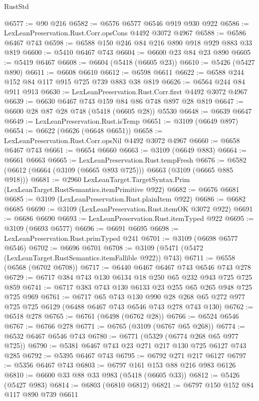 \begin{lexlean}{RustStd}
\begin{coremodule}
@6577 := @90 @216
@6582 := @6576 @6577 @6546 @919 @930 @922
@6586 := LexLeanPreservation.Rust.Corr.opsCons @4492 @3072 @4967
@6588 := @6586 @6467 @743
@6598 := @6588 @150 @246 @84 @216 @890 @918 @929 @883 @33 @819
@6600 := @5410 @6467 @743
@6604 := @6600 @23 @84 @23 @890
@6605 := @5419 @6467
@6608 := @6604 (@5418 (@6605 @23))
@6610 := @5426 (@5427 @890)
@6611 := @6608 @6610
@6612 := @6598 @6611
@6622 := @6588 @244 @152 @84 @117 @915 @725 @739 @883 @38 @819
@6626 := @6564 @244 @84 @911 @913
@6630 := LexLeanPreservation.Rust.Corr.first @4492 @3072 @4967
@6639 := @6630 @6467 @743 @159 @84 @86 @748 @897 @28 @819
@6647 := @6600 @28 @87 @28 @748 (@5418 (@6605 @28)) @5530
@6648 := @6639 @6647
@6649 := LexLeanPreservation.Rust.isTemp
@6651 := @3109 (@6649 @897)
@6654 := @6622 (@6626 (@6648 @6651))
@6658 := LexLeanPreservation.Rust.Corr.opsNil @4492 @3072 @4967
@6660 := @6658 @6467 @743
@6661 := @6654 @6660
@6663 := @3109 (@6649 @883)
@6664 := @6661 @6663
@6665 := LexLeanPreservation.Rust.tempFresh
@6676 := @6582 (@6612 (@6664 (@3109 (@6665 @893 @725))) @6663 (@3109 (@6665 @885 @918)))
@6681 := @2960 LexLeanTarget.TargetSyntax.Prim (LexLeanTarget.RustSemantics.itemPrimitive @922)
@6682 := @6676 @6681
@6685 := @3109 (LexLeanPreservation.Rust.plainItem @922)
@6686 := @6682 @6685
@6690 := @3109 (LexLeanPreservation.Rust.itemOK @3072 @922)
@6691 := @6686 @6690
@6693 := LexLeanPreservation.Rust.itemTyped @922
@6695 := @3109 (@6693 @6577)
@6696 := @6691 @6695
@6698 := LexLeanPreservation.Rust.primTyped @241
@6701 := @3109 (@6698 @6577 @6546)
@6702 := @6696 @6701
@6708 := @3109 (@5471 (@5472 (LexLeanTarget.RustSemantics.itemFallible @922)) @743)
@6711 := @6558 (@6568 (@6702 @6708))
@6717 := @6440 @6467 @6467 @743 @6546 @743 @278
@6729 := @6717 @384 @743 @130 @6134 @18 @250 @65 @232 @943 @725 @725 @859
@6741 := @6717 @383 @743 @130 @6133 @23 @255 @65 @265 @948 @725 @725 @969
@6761 := @6717
    @65
    @743
    @130
    @990
    @28
    @268
    @65
    @272
    @977
    @725
    @725
    @6129
    (@6488 @6467 @743 @6546 @743 @278 @743 @130)
@6762 := @6518 @278
@6765 := @6761 (@6498 (@6762 @28))
@6766 := @6524 @6546
@6767 := @6766 @278
@6771 := @6765 (@3109 (@6767 @65 @268))
@6774 := @6532 @6467 @6546 @743
@6780 := @6771 (@5329 (@6774 @268 @65 @977 @725))
@6790 := @5381 @6467 @743 @23 @271 @217 @130 @725 @6127 @743 @285
@6792 := @5395 @6467 @743
@6795 := @6792 @271 @217 @6127
@6797 := @5356 @6467 @743
@6803 := @6797 @161 @153 @88 @216 @983 @6126
@6810 := @6600 @33 @88 @33 @983 (@5418 (@6605 @33))
@6812 := @5426 (@5427 @983)
@6814 := @6803 (@6810 @6812)
@6821 := @6797 @150 @152 @84 @117 @890 @739 @6611

\end{coremodule}
\end{lexlean}
